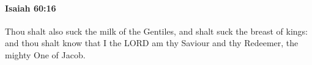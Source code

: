 
		\paragraph{Isaiah 60:16} %
			\label{ISAIAH-60-16}

			Thou shalt also suck the milk of the Gentiles, and shalt suck the breast of kings: and thou shalt know that I the LORD am thy Saviour and thy Redeemer, the mighty One of Jacob.


